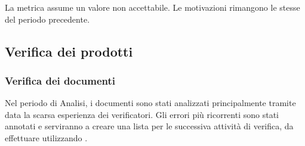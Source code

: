 				La metrica assume un valore non accettabile. Le motivazioni rimangono le stesse del periodo precedente.
				
				\newpage
			\subsection{Verifica dei prodotti}
				\subsubsection{Verifica dei documenti}
					Nel periodo di Analisi, i documenti sono stati analizzati principalmente tramite  data la scarsa esperienza dei verificatori. Gli errori più ricorrenti sono stati annotati e serviranno a creare una lista per le successiva attività di verifica, da effettuare utilizzando .		


